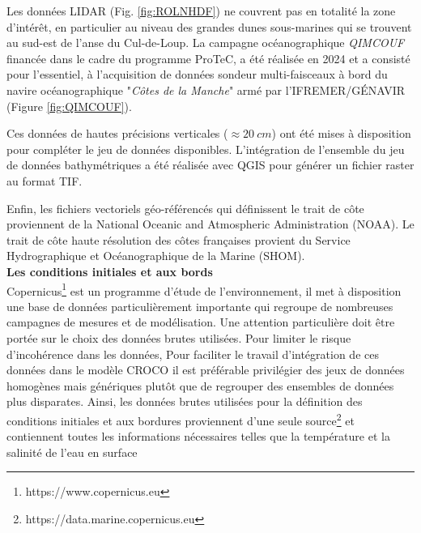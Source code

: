 \documentclass[10pt,a4paper,titlepage]{article}
\begin{document}
Les données LIDAR (Fig. \ref{fig:ROLNHDF}) ne couvrent pas en totalité la zone d'intérêt, en particulier au niveau des grandes dunes sous-marines qui se trouvent au sud-est de l'anse du Cul-de-Loup. La campagne océanographique \textit{QIMCOUF} financée dans le cadre du programme ProTeC, a été réalisée en 2024 et a consisté pour l'essentiel, à l'acquisition de données sondeur multi-faisceaux à bord du navire océanographique "\textit{Côtes de la Manche}" armé par l'IFREMER/GÉNAVIR (Figure \ref{fig:QIMCOUF}).


Ces données de hautes précisions verticales ($\approx 20~cm$) ont été mises à disposition pour compléter le jeu de données disponibles.
L'intégration de l'ensemble du jeu de données bathymétriques a été réalisée avec QGIS pour générer un fichier raster au format TIF.


Enfin, les fichiers vectoriels géo-référencés qui définissent le trait de côte proviennent de la National Oceanic and Atmospheric Administration (NOAA). Le trait de côte haute résolution des côtes françaises provient du Service Hydrographique et Océanographique de la Marine (SHOM).\\



\textbf{Les conditions initiales et aux bords}\\
Copernicus\footnote{https://www.copernicus.eu} est un programme d'étude de l'environnement, il met à disposition une base de données particulièrement importante qui regroupe de nombreuses campagnes de mesures et de modélisation.
Une attention particulière doit être portée sur le choix des données brutes utilisées.
Pour limiter le risque d'incohérence dans les données, 
Pour faciliter le travail d'intégration de ces données dans le modèle CROCO il est préférable privilégier des jeux de données homogènes mais génériques plutôt que de regrouper des ensembles de données plus disparates.
Ainsi, les données brutes utilisées pour la définition des conditions initiales et aux bordures proviennent d'une seule source\footnote{https://data.marine.copernicus.eu} et contiennent toutes les informations nécessaires telles que la température et la salinité de l'eau en surface \parencite{copernicus_marine_data}
\end{document}
